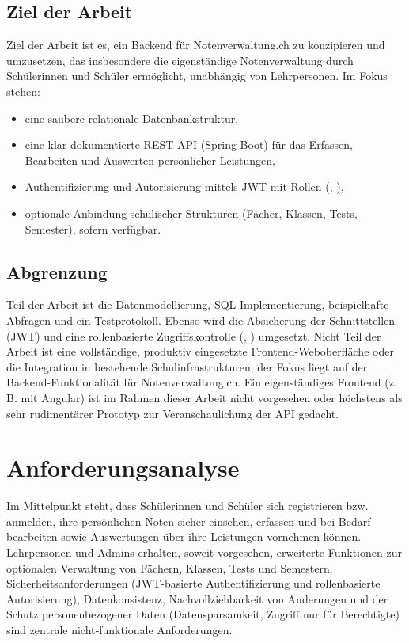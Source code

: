 \documentclass[12pt,a4paper]{article}
\newcommand{\code}[1]{\texttt{\detokenize{#1}}}
\begin{document}
    \subsection{Ziel der Arbeit}
    Ziel der Arbeit ist es, ein Backend für Notenverwaltung.ch zu konzipieren und umzusetzen,
    das insbesondere die eigenständige Notenverwaltung durch Schülerinnen und Schüler ermöglicht, unabhängig von Lehrpersonen. Im Fokus stehen:
    \begin{itemize}
        \item eine saubere relationale Datenbankstruktur,
        \item eine klar dokumentierte REST-API (Spring Boot) für das Erfassen, Bearbeiten und Auswerten persönlicher Leistungen,
        \item Authentifizierung und Autorisierung mittels JWT mit Rollen (\code{USER}, \code{ADMIN}),
        \item optionale Anbindung schulischer Strukturen (Fächer, Klassen, Tests, Semester), sofern verfügbar.
    \end{itemize}

    \subsection{Abgrenzung}
    Teil der Arbeit ist die Datenmodellierung, SQL-Implementierung, beispielhafte Abfragen und ein Testprotokoll.
    Ebenso wird die Absicherung der Schnittstellen (JWT) und eine rollenbasierte Zugriffskontrolle
    (\code{USER}, \code{ADMIN}) umgesetzt. Nicht Teil der Arbeit ist eine vollständige,
    produktiv eingesetzte Frontend-Weboberfläche oder die Integration in bestehende Schulinfrastrukturen; der Fokus
    liegt auf der Backend-Funktionalität für Notenverwaltung.ch. Ein eigenständiges Frontend (z. B. mit Angular) ist
    im Rahmen dieser Arbeit nicht vorgesehen oder höchstens als sehr rudimentärer Prototyp zur Veranschaulichung der API gedacht.
    \newpage



    \section{Anforderungsanalyse}
    Im Mittelpunkt steht, dass Schülerinnen und Schüler sich registrieren bzw. anmelden, ihre persönlichen Noten sicher einsehen,
    erfassen und bei Bedarf bearbeiten sowie Auswertungen über ihre Leistungen vornehmen können.
    Lehrpersonen und Admins erhalten, soweit vorgesehen, erweiterte Funktionen zur optionalen Verwaltung von Fächern, Klassen, Tests und Semestern.
    Sicherheitsanforderungen (JWT-basierte Authentifizierung und rollenbasierte Autorisierung), Datenkonsistenz, Nachvollziehbarkeit von Änderungen
    und der Schutz personenbezogener Daten (Datensparsamkeit, Zugriff nur für Berechtigte) sind zentrale nicht‑funktionale Anforderungen.
\end{document}
